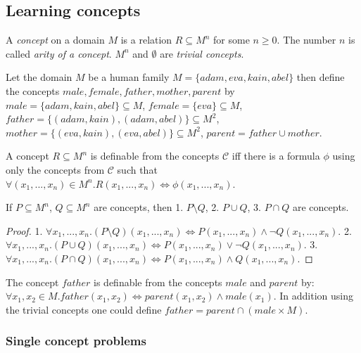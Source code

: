 \subsection{Learning concepts}
\begin{defn}
A \emph{concept} on a domain $M$ is a relation $R \subseteq M^n$ for some $n \ge 0$.
The number $n$ is called \emph{arity of a concept}.
$M^n$ and $\emptyset$ are \emph{trivial concepts}.
\end{defn}

\begin{exmp}
Let the domain $M$ be a human family $M=\{adam, eva, kain, abel\}$ then define the concepts $male, female, father, mother, parent$ by
$male=\{adam, kain, abel\}\subseteq{M}$,
$female=\{eva\}\subseteq{M}$,
$father=\{(adam,kain), (adam,abel)\}\subseteq{M^2}$,
$mother=\{(eva,kain), (eva,abel)\}\subseteq{M^2}$,
$parent=father \cup mother$.
\end{exmp}
\begin{defn}
A concept $R\subseteq M^n$ is definable from the concepts $\mathcal{C}$ iff there is a formula $\phi$ using only the concepts from $\mathcal{C}$ such that
$\forall (x_1, ..., x_n) \in M^n. R(x_1, ..., x_n) \iff \phi(x_1, ..., x_n)$.
\end{defn}
\begin{corollary}
If $P\subseteq{M^n}$, $Q\subseteq{M^n}$ are concepts, then
1. $P \setminus Q$, 2. $P \cup Q$, 3. $P \cap Q$ are concepts.
\end{corollary}
\begin{proof}
1. $\forall x_1, ..., x_n. (P \setminus Q)(x_1, ..., x_n) \iff
P(x_1, ..., x_n) \land \neg Q(x_1, ..., x_n)$.
2. $\forall x_1, ..., x_n. (P \cup Q)(x_1, ..., x_n) \iff
P(x_1, ..., x_n) \lor \neg Q(x_1, ..., x_n)$.
3. $\forall x_1, ..., x_n. (P \cap Q)(x_1, ..., x_n) \iff
P(x_1, ..., x_n) \land Q(x_1, ..., x_n)$.
\end{proof}

\begin{exmp}
The concept $father$ is definable from the concepts $male$ and $parent$ by:
$\forall x_1, x_2 \in M. father(x_1, x_2) \iff parent(x_1, x_2) \land male(x_1)$. In addition using the trivial concepts one could define
$father=parent \cap (male \times M)$.
\end{exmp}

\subsubsection{Single concept problems}


